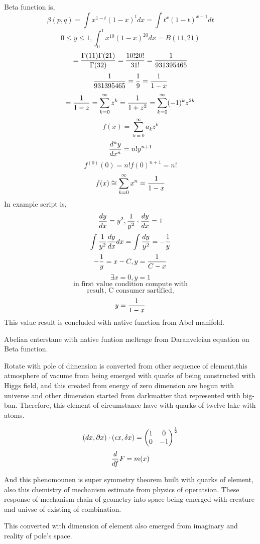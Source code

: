 \documentclass{jsarticle}
\begin{document}
      Beta function is,
      $$ \beta(p,q) = \int x^{1 - t} (1 - x)^{t}dx = \int t^{x}(1 - t)^{x - 1}
      dt $$
      $$ 0 \le y \le 1, \int^{1}_{0} x^{10}(1 - x)^{20}dx = B(11,21) $$
      $$ = {{\Gamma(11)\Gamma(21)} \over \Gamma(32)} = {{10! 20!} \over {
	      31!}} = {1 \over {931395465}} $$
       $$ {1 \over {931395465}} = {1 \over 9} = {1 \over {1 - x}} $$
	 $$     = {1 \over {1 - z}} =
	      \sum_{k=0}^{\infty}z^k = {1 \over {1 + z^2}} = \sum_{
		      k=0}^{\infty} (-1)^k z^{2k} $$
      $$ f(x) = \sum_{k=0}^{\infty} a_k z^k $$
      $$ {{d^n y} \over dx^n} = n! y^{n+1} $$
      $$ f^{(0)}(0) = n!f(0)^{n+1} = n! $$
      $$ f(x) \cong \sum_{k=0}^{\infty}x^n = {1 \over {1 - x}} $$
      In example script is,
      $$ {{dy} \over dx} = y^2, {1 \over y^2}\cdot {dy \over dx} = 1 $$
      $$ \int {1 \over y^2}{dy \over dx}dx = \int{dy \over y^2} = - {1 \over y
      } $$
      $$ - {1 \over y} = x - C, y = {1 \over {C - x}} $$
      $$ \exists x = 0, y = 1 $$
      $$\text{in first value condition compute with} $$
      $$ \text{result, C consumer sartified,} $$
      $$ y = {1 \over {1 - x}} $$
      This value result is concluded with native function from Abel manifold.

      Abelian enterstane with native funtion meltrage from Daranvelcian
      equation on Beta function.
 
       Rotate with pole of dimension is converted from 
       other sequence of element,this atmosphere of vacume 
       from being emerged with quarks of being constructed
with Higgs field, and this created from energy of zero dimension are begun with
universe and other dimension started from darkmatter that represented with 
big-ban.
Therefore, this element of circumstance have with quarks of twelve lake with
atoms.

  $$ (dx, \partial x)\cdot (\epsilon x, \delta x) = \begin{pmatrix}
	  1 & 0 \\
  0 & - 1 \end{pmatrix}^{1 \over 2}  $$
  $$ {d \over df} F = m(x) $$

 And this phenomounen is super symmetry theorem built with quarks of element, 
also this chemistry of mechanism estimate from physics of operatsion.
These response of mechanism chain of geometry into space being emerged with
creature and univse of existing of combination.

  This converted with dimension of element also emerged from imaginary and 
reality of pole's space.
\end{document}
